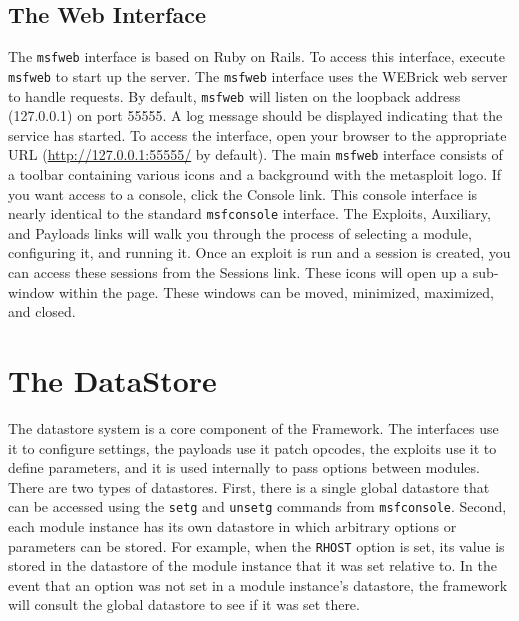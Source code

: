 \documentclass{report}
\begin{document}
    \section{The Web Interface}
    \label{STARTED-WEB}

\par
The \texttt{msfweb} interface is based on Ruby on Rails. To access this interface,
execute \texttt{msfweb} to start up the server. The \texttt{msfweb}
interface uses the WEBrick web server to handle requests. By default, \texttt{msfweb} will listen
on the loopback address (127.0.0.1) on port 55555. A log message should be displayed indicating that
the service has started. To access the interface, open your browser to the appropriate URL 
(\url{http://127.0.0.1:55555/} by default). The main \texttt{msfweb} interface consists of a toolbar
containing various icons and a background with the metasploit logo. If you want access to a console, 
click the Console link. This console interface is nearly identical to the standard 
\texttt{msfconsole} interface. The Exploits, Auxiliary, and Payloads links will walk you through 
the process of selecting a module, configuring it, and running it. Once an exploit is run and
a session is created, you can access these sessions from the Sessions link. These icons will open up
a sub-window within the page. These windows can be moved, minimized, maximized, and closed.

\pagebreak
\chapter{The DataStore}

\par
The datastore system is a core component of the Framework.  The interfaces use
it to configure settings, the payloads use it patch opcodes, the exploits
use it to define parameters, and it is used internally to pass options between
modules.  There are two types of datastores.  First, there is a single global
datastore that can be accessed using the \texttt{setg} and \texttt{unsetg}
commands from \texttt{msfconsole}.  Second, each module instance has its own
datastore in which arbitrary options or parameters can be stored.  For
example, when the \texttt{RHOST} option is set, its value is stored in the
datastore of the module instance that it was set relative to.  In the event
that an option was not set in a module instance's datastore, the framework
will consult the global datastore to see if it was set there.
\end{document}
